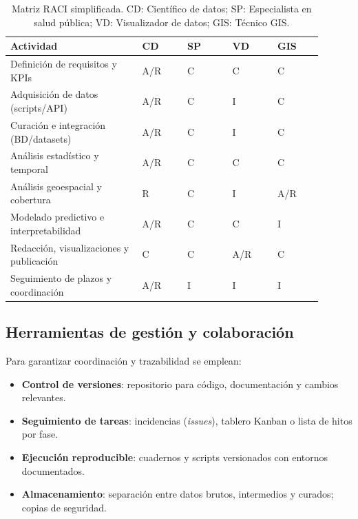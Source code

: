 \begin{table}[htbp]
\centering
\small
\renewcommand{\arraystretch}{1.15}
\begin{tabular}{p{0.38\linewidth} p{0.13\linewidth} p{0.13\linewidth} p{0.13\linewidth} p{0.13\linewidth}}
\hline
\textbf{Actividad} & \textbf{CD} & \textbf{SP} & \textbf{VD} & \textbf{GIS} \\
\hline
Definición de requisitos y KPIs & A/R & C & C & C \\
Adquisición de datos (scripts/API) & A/R & C & I & C \\
Curación e integración (BD/datasets) & A/R & C & I & C \\
Análisis estadístico y temporal & A/R & C & C & C \\
Análisis geoespacial y cobertura & R & C & I & A/R \\
Modelado predictivo e interpretabilidad & A/R & C & C & I \\
Redacción, visualizaciones y publicación & C & C & A/R & C \\
Seguimiento de plazos y coordinación & A/R\footnotemark & I & I & I \\
\hline
\end{tabular}
\caption{Matriz RACI simplificada. CD: Científico de datos; SP: Especialista en salud pública;
VD: Visualizador de datos; GIS: Técnico GIS.}
\label{tab:raci}
\end{table}


\subsection{Herramientas de gestión y colaboración}\label{subsec:herramientas-de-gestion-y-colaboracion}

Para garantizar coordinación y trazabilidad se emplean:
\begin{itemize}
    \item \textbf{Control de versiones}: repositorio para código, documentación y cambios relevantes.
    \item \textbf{Seguimiento de tareas}: incidencias (\emph{issues}), tablero Kanban o lista de hitos por fase.
    \item \textbf{Ejecución reproducible}: cuadernos y scripts versionados con entornos documentados.
    \item \textbf{Almacenamiento}: separación entre datos brutos, intermedios y curados; copias de seguridad.
\end{itemize}

